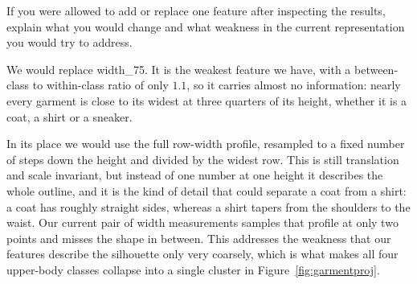 \documentclass[11pt]{article}
\begin{document}
\begin{question}
If you were allowed to add or replace one feature after inspecting the
results, explain what you would change and what weakness in the current
representation you would try to address.
\end{question}

We would replace width\_75. It is the weakest feature we have, with a
between-class to within-class ratio of only $1.1$, so it carries almost no
information: nearly every garment is close to its widest at three quarters of
its height, whether it is a coat, a shirt or a sneaker.

In its place we would use the full row-width profile, resampled to a fixed
number of steps down the height and divided by the widest row. This is still
translation and scale invariant, but instead of one number at one height it
describes the whole outline, and it is the kind of detail that could separate
a coat from a shirt: a coat has roughly straight sides, whereas a shirt tapers
from the shoulders to the waist. Our current pair of width measurements
samples that profile at only two points and misses the shape in between. This
addresses the weakness that our features describe the silhouette only very
coarsely, which is what makes all four upper-body classes collapse into a
single cluster in Figure~\ref{fig:garmentproj}.
\end{document}
